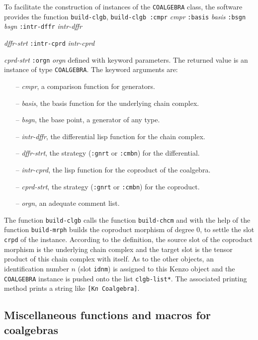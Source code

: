 To facilitate the construction of instances of the {\tt COALGEBRA} class, the
software provides the function {\tt build-clgb},
\vskip 0.40cm
{\tt build-clgb :cmpr} {\em cmpr} {\tt :basis} {\em basis} {\tt :bsgn} {\em bsgn} {\tt :intr-dffr} {\em intr-dffr} \par
\hspace*{22.5mm}{\tt :dffr-strt} {\em dffr-strt} {\tt :intr-cprd} {\em intr-cprd} \par
\hspace*{22.5mm}{\tt :cprd-strt} {\em cprd-strt} {\tt :orgn} {\em orgn}
\vskip 0.40cm
defined with keyword parameters. The returned value is an instance of type {\tt COALGEBRA}. 
The keyword arguments are:
\begin{itemize}
\item[--] {\em cmpr}, a comparison function for generators.
\item[--] {\em basis}, the basis function for the underlying chain complex.
\item[--] {\em bsgn}, the  base point, a generator of any type.
\item[--] {\em intr-dffr}, the differential lisp function for the chain complex.
\item[--] {\em dffr-strt}, the strategy ({\tt :gnrt} or {\tt :cmbn}) for the differential.
\item[--] {\em intr-cprd}, the lisp function for the coproduct of the coalgebra.
\item[--] {\em cprd-strt}, the strategy ({\tt :gnrt} or {\tt :cmbn}) for the coproduct.
\item[--] {\em orgn}, an adequate comment list.
\end{itemize}
The function {\tt build-clgb} calls  the function {\tt build-chcm} and with the help of the function
{\tt build-mrph} builds the coproduct morphism of degree $0$, to settle the
slot {\tt crpd} of the instance. According to the definition, the
source slot of the coproduct morphism is the underlying chain complex and the target slot
is the tensor product of this chain complex with itself. As to the other objects,
an identification number $n$ (slot {\tt idnm}) is assigned to this Kenzo object and the 
{\tt COALGEBRA} instance is  pushed  onto the list {\tt *clgb-list*}. 
The  associated printing method prints a string like 
{\tt [K{\em n} Coalgebra]}.

\subsection {Miscellaneous functions and macros for coalgebras}

